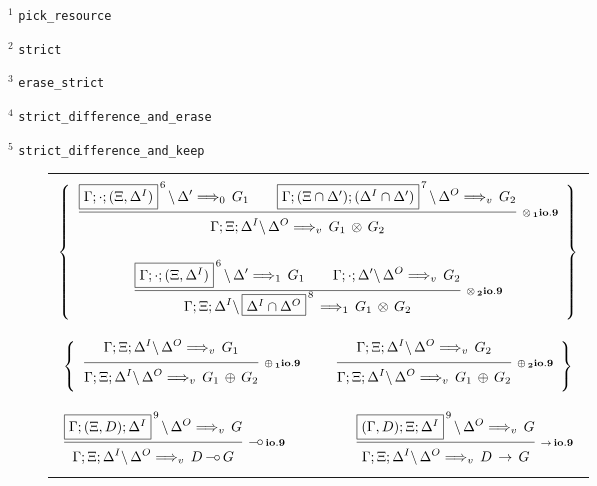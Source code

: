 \bigskip

$^1$ {\tt pick\_resource}

$^2$ {\tt strict}

$^3$ {\tt erase\_strict}

$^4$ {\tt strict\_difference\_and\_erase}

$^5$ {\tt strict\_difference\_and\_keep}






\clearpage
\begin{figure}[t]
  \begin{center}
    \leavevmode

    \begin{tabular}{|c|}
      \hline \\
      $\left\{
        \begin{array}{c}
          \ruleII
            {\ioIX{\fb{\G;\cdot;(\X,\D^I)}{6}}{\D'}{G_1}{0}}
            {\ioIX{\fb{\G;(\X \cap \D');(\D^I \cap \D')}{7}}{\D^O}{G_2}{v}}
            {\ioIX{\G;\X;\D^I}{\D^O}{G_1 \Times G_2}{v}}
            {\Times_1 io.9}
        \\ \\
          \ruleII
            {\ioIX{\fb{\G;\cdot;(\X,\D^I)}{6}}{\D'}{G_1}{1}}
            {\ioIX{\G;\cdot;\D'}{\D^O}{G_2}{v}}
            {\ioIX{\G;\X;\D^I}{\fb{\D^I \cap \D^O}{8}}{G_1 \Times G_2}{1}}
            {\Times_2 io.9}
        \end{array}
      \right\}$

      \\ \\ \\
      $\left\{
        \begin{array}{ccc}
          \ruleI
            {\ioIX{\G;\X;\D^I}{\D^O}{G_1}{v}}
            {\ioIX{\G;\X;\D^I}{\D^O}{G_1 \Plus G_2}{v}}
            {\Plus_1 io.9}
        &
          \hspace{0.5em}
        &
          \ruleI
            {\ioIX{\G;\X;\D^I}{\D^O}{G_2}{v}}
            {\ioIX{\G;\X;\D^I}{\D^O}{G_1 \Plus G_2}{v}}
            {\Plus_2 io.9}
        \end{array}
      \right\}$

      \\ \\ \\
      $\begin{array}{ccc}
        \ruleI
          {\ioIX{\fb{\G;(\X,D);\D^I}{9}}{\D^O}{G}{v}}
          {\ioIX{\G;\X;\D^I}{\D^O}{D \Lolli G}{v}}
          {\Lolli io.9}
      &
        \hspace{3em}
      &
        \ruleI
          {\ioIX{\fb{(\G,D);\X;\D^I}{9}}{\D^O}{G}{v}}
          {\ioIX{\G;\X;\D^I}{\D^O}{D \Imp G}{v}}
          {\Imp io.9}
      \end{array}$


\end{tabular}
\end{center}
\end{figure}
